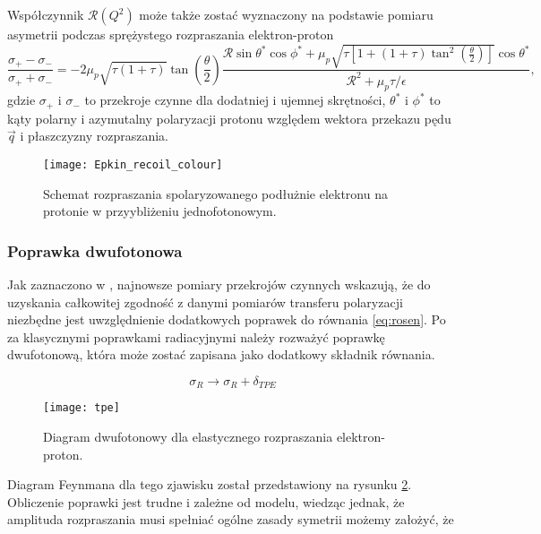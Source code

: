 \documentclass[11pt]{book}
\theoremstyle{definition}
\begin{document}
Współczynnik $\mathcal{R}\left(Q^2\right)$ może także zostać wyznaczony na podstawie pomiaru asymetrii podczas sprężystego rozpraszania elektron-proton \cite{2009PhRvC..79f5204A, 2007PrPNP..59..694P}
%
$$
\frac{\sigma_+ - \sigma_-}{\sigma_+ + \sigma_-} = -2\mu_p \sqrt{\tau \left(1+\tau\right)} \tan \left(\frac{\theta}{2}\right) \frac{\mathcal{R} \sin \theta^* \cos \phi^* + \mu_p \sqrt{\tau \left[ 1 + \left(1+\tau\right) \tan^2 \left(\frac{\theta}{2}\right) \right]} \cos \theta^* }{\mathcal{R}^2 + \mu_p \tau / \epsilon},
$$
%
gdzie $\sigma_+$ i $\sigma_-$ to przekroje czynne dla dodatniej i ujemnej skrętności, $\theta^*$ i $\phi^*$ to kąty polarny i azymutalny polaryzacji protonu względem wektora przekazu pędu $\vec{q}$ i płaszczyzny rozpraszania.
%

\begin{figure}[htp!]
	\centering
	\texttt{[image: Epkin\_recoil\_colour]}
	\caption{Schemat rozpraszania spolaryzowanego podłużnie elektronu na protonie w przyybliżeniu jednofotonowym.} 
	\label{fig:recoil}
\end{figure}



\subsubsection{Poprawka dwufotonowa}
Jak zaznaczono w \cite{2007PhRvC..76c5205A}, najnowsze pomiary przekrojów czynnych wskazują, że do uzyskania całkowitej zgodność z danymi pomiarów transferu polaryzacji niezbędne jest uwzględnienie dodatkowych poprawek do równania \ref{eq:rosen}. Po za klasycznymi poprawkami radiacyjnymi należy rozważyć poprawkę dwufotonową, która może zostać zapisana jako dodatkowy składnik równania.

\begin{equation}
\sigma_R \rightarrow \sigma_R + \delta_{TPE}
\end{equation}

%
\begin{figure}[htp!]
	\centering
	\texttt{[image: tpe]}
	\caption{Diagram dwufotonowy dla elastycznego rozpraszania elektron-proton.} 
	\label{fig:tpe}
\end{figure}


Diagram Feynmana dla tego zjawisku został przedstawiony na rysunku \ref{fig:tpe}. Obliczenie poprawki jest trudne i zależne od modelu, wiedząc jednak, że amplituda rozpraszania musi spełniać ogólne zasady symetrii możemy założyć, że 
\end{document}
